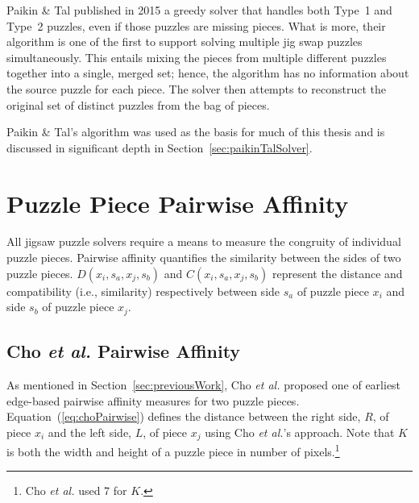 \documentclass{report}
\def\eref#1{(\ref{#1})}
\begin{document}
Paikin \& Tal \cite{paikin2015} published in 2015 a greedy solver that handles both Type~1 and Type~2 puzzles, even if those puzzles are missing pieces.  What is more, their algorithm is one of the first to support solving multiple jig swap puzzles simultaneously.  This entails mixing the pieces from multiple different puzzles together into a single, merged set; hence, the algorithm has no information about the source puzzle for each piece.  The solver then attempts to reconstruct the original set of distinct puzzles from the bag of pieces.

Paikin \& Tal's algorithm was used as the basis for much of this thesis and is discussed in significant depth in Section~\ref{sec:paikinTalSolver}.















\pagebreak
\section{Puzzle Piece Pairwise Affinity}\label{sec:piecePairwiseAffinity}

All jigsaw puzzle solvers require a means to measure the congruity of individual puzzle pieces.  Pairwise affinity quantifies the similarity between the sides of two puzzle pieces.  $D(x_i, s_a, x_j, s_b)$ and $C(x_i, s_a, x_j, s_b)$ represent the distance and compatibility (i.e., similarity) respectively between side $s_a$ of puzzle piece $x_i$ and side $s_b$ of puzzle piece $x_j$.  

\subsection{Cho \textit{et al.} Pairwise Affinity}\label{sec:choPairwiseAffinity}

As mentioned in Section~\ref{sec:previousWork}, Cho \textit{et al.} \cite{cho2010} proposed one of earliest edge-based pairwise affinity measures for two puzzle pieces.  Equation~\eref{eq:choPairwise} defines the distance between the right side, $R$, of piece $x_i$ and the left side, $L$, of piece $x_j$ using Cho \textit{et al.}'s approach.  Note that $K$ is both the width and height of a puzzle piece in number of pixels.\footnote{Cho \textit{et al.} used 7 for $K$.}
\end{document}
